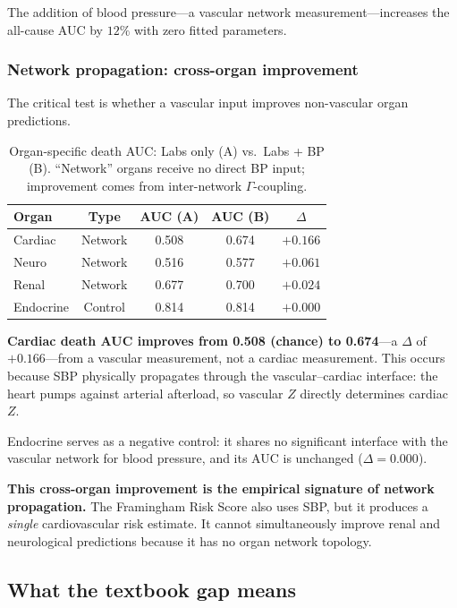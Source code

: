 \documentclass[aps,pre,twocolumn,superscriptaddress,floatfix]{revtex4-2}
\begin{document}
The addition of blood pressure---a vascular network
measurement---increases the all-cause AUC by $12\%$
with zero fitted parameters.

\subsubsection{Network propagation: cross-organ improvement}

The critical test is whether a vascular input improves
non-vascular organ predictions.

\begin{table}[h]
\centering
\caption{Organ-specific death AUC: Labs only (A) vs.\
Labs + BP (B).  ``Network'' organs receive no direct BP
input; improvement comes from inter-network $\Gamma$-coupling.}
\label{tab:propagation}
\begin{tabular}{lcccc}
\toprule
Organ & Type & AUC (A) & AUC (B) & $\Delta$ \\
\midrule
Cardiac  & Network & 0.508 & 0.674 & $+0.166$ \\
Neuro    & Network & 0.516 & 0.577 & $+0.061$ \\
Renal    & Network & 0.677 & 0.700 & $+0.024$ \\
Endocrine & Control & 0.814 & 0.814 & $+0.000$ \\
\bottomrule
\end{tabular}
\end{table}

\textbf{Cardiac death AUC improves from 0.508 (chance) to
0.674}---a $\Delta$ of $+0.166$---from a vascular measurement,
not a cardiac measurement.
This occurs because SBP physically propagates through the
vascular--cardiac interface: the heart pumps against arterial
afterload, so vascular $Z$ directly determines cardiac $Z$.

Endocrine serves as a negative control: it shares no
significant interface with the vascular network for blood
pressure, and its AUC is unchanged ($\Delta = 0.000$).

\textbf{This cross-organ improvement is the empirical
signature of network propagation.}
The Framingham Risk Score also uses SBP,
but it produces a \emph{single} cardiovascular risk
estimate.  It cannot simultaneously improve renal and
neurological predictions because it has no organ network
topology.

\subsection{What the textbook gap means}
\end{document}
